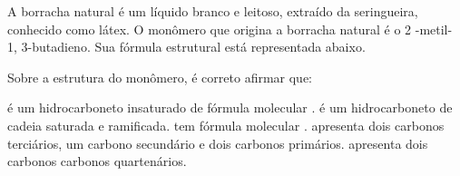 \documentclass[10pt]{scrartcl}
\begin{document}
\begin{exercise}[points=1]
A borracha natural é um líquido branco e leitoso, extraído da seringueira, conhecido como látex. O monômero que origina a borracha natural é o 2 -metil- 1, 3-butadieno. Sua fórmula estrutural está representada abaixo.


\begin{center}
\end{center}

Sobre a estrutura do monômero, é correto afirmar que:
\begin{choice}
\choice é um hidrocarboneto insaturado de fórmula molecular .
\choice é um hidrocarboneto de cadeia saturada e ramificada.
\choice tem fórmula molecular .
\choice apresenta dois carbonos terciários, um carbono secundário e dois carbonos primários.
\choice apresenta dois carbonos carbonos quartenários.
\end{choice}
\end{exercise}
\begin{solution}

\end{solution}







\end{document}
